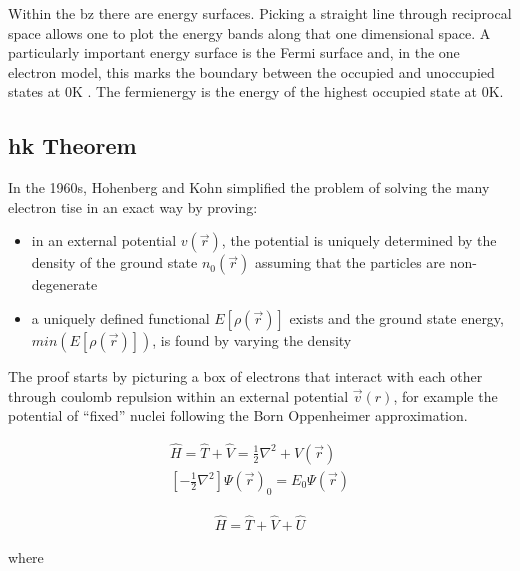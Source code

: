 Within the \acrshort{bz} there are energy surfaces.  Picking a straight line through reciprocal space allows one to plot the energy bands along that one dimensional space.  A particularly important energy surface is the Fermi surface and, in the one electron model, this marks the boundary between the occupied and unoccupied states at 0K \cite{hjonesfermi}.  The \Gls{fermienergy} is the energy of the highest occupied state at 0K.



\subsection{\Acrlong{hk} Theorem}

In the 1960s, Hohenberg and Kohn\cite{hohenbergkohn} simplified the problem of solving the many electron \acrshort{tise} in an exact way by proving:

\begin{itemize}
\item in an external potential $v(\vec{r})$, the potential is uniquely determined by the density of the ground state $n_0(\vec{r})$ assuming that the particles are non-degenerate
\item a uniquely defined functional $E[\rho(\vec{r})]$ exists and the ground state energy, $min(E[\rho(\vec{r})])$, is found by varying the density
\end{itemize}

The proof starts by picturing a box of electrons that interact with each other through coulomb repulsion within an external potential  $\vec{v}(r)$, for example the potential of \enquote{fixed} nuclei following the Born Oppenheimer approximation.

\begin{equation}
\begin{split}
\hat{H} = \hat{T} + \hat{V} = \frac{1}{2} \nabla^2 + V(\vec{r})\\
\left[-\frac{1}{2} \nabla^2 \right] \Psi(\vec{r})_{0} = E_{0} \Psi(\vec{r})
\end{split}
\label{eq:eqtishk}
\end{equation}

\begin{equation}
\begin{split}
\hat{H} = \hat{T} + \hat{V} + \hat{U}
\end{split}
\label{eq:eqHKhamiltonian}
\end{equation}

where

